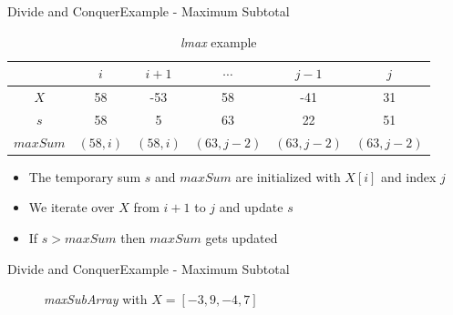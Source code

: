 \begin{frame}{Divide and Conquer}{Example - Maximum Subtotal}
  \begin{table}
    \caption{\textit{lmax} example}
    \label{fig:divide_and_conquer:lmax_example}
    \begin{tabular}{c|ccccc}
      {} & $i$ & $i+1$ & $\cdots$ & $j-1$ & $j$\\
      \midrule
      $X$ & 58 & -53 & 58 & -41 & 31\\
      \midrule
       {\color{Mittel-Blau}$s$} & 58 & 5 & 63 & 22 & 51\\
      {\color{Mittel-Blau}$maxSum$} &
      $(58, i)$ & $(58, i)$ & $(63, j-2)$ & $(63, j-2)$ & $(63, j-2)$
    \end{tabular}
  \end{table}
  \begin{itemize}
    \item
      The temporary sum {\color{Mittel-Blau}$s$} and
      {\color{Mittel-Blau}$maxSum$} are initialized with $X[i]$ and index $j$
    \item
      We {\color{Mittel-Blau}iterate over $X$ from $i+1$ to $j$} and
      {\color{Mittel-Blau}update $s$}
    \item
      If {\color{Mittel-Blau}$s > maxSum$} then {\color{Mittel-Blau}$maxSum$}
      gets updated
  \end{itemize}
\end{frame}


\begin{frame}{Divide and Conquer}{Example - Maximum Subtotal}
  \begin{figure}
    \begin{adjustbox}{width=\linewidth}
      
    \end{adjustbox}
    \caption{\textit{maxSubArray} with $X = [-3, 9, -4, 7]$}
    \label{fig:divide_and_conquer:max_sub_array_example}
  \end{figure}
\end{frame}



